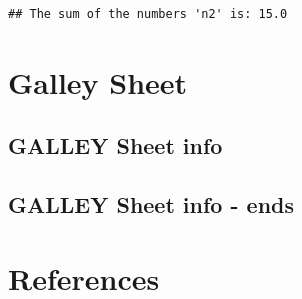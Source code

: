 \documentclass[
  12 pt,
  a4paper,
]{book}
\numberwithin{equation}{section}
\theoremstyle{plain}      %
\theoremstyle{definition} %
\theoremstyle{remark}     %
\theoremstyle{note}         %
\begin{document}
\begin{verbatim}
## The sum of the numbers 'n2' is: 15.0
\end{verbatim}

\newpage

\listoffigures
\lstlistoflistings

\newpage

\hypertarget{galley-sheet}{%
\chapter*{Galley Sheet}\label{galley-sheet}}

\hypertarget{galley-sheet-info}{%
\section{\texorpdfstring{\textbf{GALLEY Sheet
info}}{GALLEY Sheet info}}\label{galley-sheet-info}}

\layout

\hypertarget{galley-sheet-info---ends}{%
\section{\texorpdfstring{\textbf{GALLEY Sheet info -
ends}}{GALLEY Sheet info - ends}}\label{galley-sheet-info---ends}}

\newpage

\hypertarget{references}{%
\chapter{References}\label{references}}

\backmatter
\end{document}
